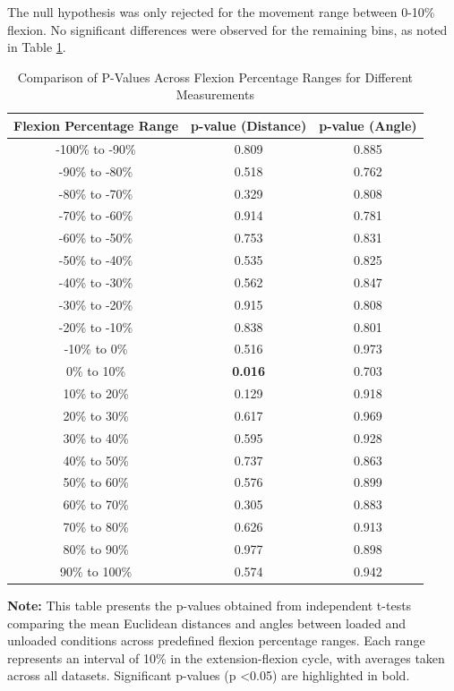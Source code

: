 \documentclass{micro-econ-thesis}
\begin{document}
The null hypothesis was only rejected for the movement range between 0-10\% flexion. No significant differences were observed for the remaining bins, as noted in Table \ref{tab:p_values_combined}. 
\begin{table}[H]
	\centering
	\caption{Comparison of P-Values Across Flexion Percentage Ranges for Different Measurements}
	\label{tab:p_values_combined}
	\begin{tabular}{@{}ccc@{}}
		\toprule
		Flexion Percentage Range & p-value (Distance) & p-value (Angle) \\ \midrule
		-100\% to -90\% & 0.809 & 0.885 \\
		-90\% to -80\% & 0.518 & 0.762 \\
		-80\% to -70\% & 0.329 & 0.808 \\
		-70\% to -60\% & 0.914 & 0.781 \\
		-60\% to -50\% & 0.753 & 0.831 \\
		-50\% to -40\% & 0.535 & 0.825 \\
		-40\% to -30\% & 0.562 & 0.847 \\
		-30\% to -20\% & 0.915 & 0.808 \\
		-20\% to -10\% & 0.838 & 0.801 \\
		-10\% to 0\% & 0.516 & 0.973 \\
		0\% to 10\% & \textbf{0.016} & 0.703 \\
		10\% to 20\% & 0.129 & 0.918 \\
		20\% to 30\% & 0.617 & 0.969 \\
		30\% to 40\% & 0.595 & 0.928 \\
		40\% to 50\% & 0.737 & 0.863 \\
		50\% to 60\% & 0.576 & 0.899 \\
		60\% to 70\% & 0.305 & 0.883 \\
		70\% to 80\% & 0.626 & 0.913 \\
		80\% to 90\% & 0.977 & 0.898 \\
		90\% to 100\% & 0.574 & 0.942 \\
		\bottomrule
	\end{tabular}
	\begin{minipage}[t]{\linewidth} %
		\bigskip
		\textbf{Note:} This table presents the p-values obtained from independent t-tests comparing the mean Euclidean distances and angles between loaded and unloaded conditions across predefined flexion percentage ranges. Each range represents an interval of 10\% in the extension-flexion cycle, with averages taken across all datasets. Significant p-values (p \textless 0.05) are highlighted in bold.
	\end{minipage}
\end{table}
\end{document}
